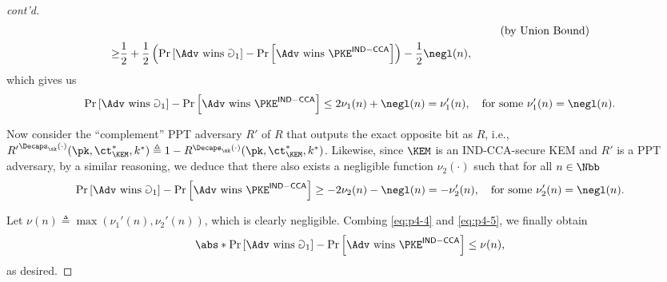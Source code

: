 \begin{answer}
\begin{proof}[cont'd]
\begin{align*}
            &\hspace{12cm} (\textrm{by Union Bound})\\
            \ge& \frac{1}{2}+\frac{1}{2}\left(\Pr\left[\Adv \textrm{ wins }  \Game_1\right] - \Pr\left[\Adv \textrm{ wins }  \PKE^{\mathsf{IND-CCA}}\right]\right) -\frac{1}{2}\negl(n),
        \end{align*}
        which gives us
        \begin{equation}\label{eq:p4-4}
            \Pr\left[\Adv \textrm{ wins }  \Game_1\right] - \Pr\left[\Adv \textrm{ wins }  \PKE^{\mathsf{IND-CCA}}\right] 
            \le 2\nu_1(n) + \negl(n) = \nu_1'(n),
            \quad \textrm{for some } \nu_1'(n)=\negl(n).
        \end{equation}
        
        Now consider the ``complement'' PPT adversary $R'$ of $R$ that outputs the exact opposite bit as $R$, i.e., ${R'}^{\Decaps_\sk(\cdot)}(\pk, \ct_\KEM^\ast, k^\ast)\triangleq 1- R^{\Decaps_\sk(\cdot)}(\pk, \ct_\KEM^\ast, k^\ast)$. Likewise, since $\KEM$ is an IND-CCA-secure KEM and $R'$ is a PPT adversary, by a similar reasoning, we deduce that there also exists a negligible function $\nu_2(\cdot)$ such that for all $n\in\Nbb$
        \begin{equation}\label{eq:p4-5}
            \Pr\left[\Adv \textrm{ wins }  \Game_1\right] - \Pr\left[\Adv \textrm{ wins }  \PKE^{\mathsf{IND-CCA}}\right] 
            \ge -2\nu_2(n) - \negl(n) = -\nu_2'(n),
            \quad \textrm{for some } \nu_2'(n)=\negl(n).
        \end{equation}
        
        Let $\nu(n)\triangleq \max(\nu_1'(n), \nu_2'(n))$, which is clearly negligible. Combing \eqref{eq:p4-4} and \eqref{eq:p4-5}, we finally obtain
        \[
            \abs*{\Pr\left[\Adv \textrm{ wins }  \Game_1\right] - \Pr\left[\Adv \textrm{ wins }  \PKE^{\mathsf{IND-CCA}}\right]}
            \le \nu(n),
        \]
        as desired.
    \end{proof}


\end{answer}
